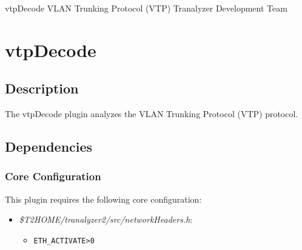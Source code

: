 \documentclass[documentation]{subfiles}
\begin{document}
\trantitle
    {vtpDecode} %
    {VLAN Trunking Protocol (VTP)} %
    {Tranalyzer Development Team} %

\section{vtpDecode}\label{s:vtpDecode}

\subsection{Description}
The vtpDecode plugin analyzes the VLAN Trunking Protocol (VTP) protocol.

\subsection{Dependencies}

\subsubsection{Core Configuration}
This plugin requires the following core configuration:
\begin{itemize}
    \item {\em \$T2HOME/tranalyzer2/src/networkHeaders.h}:
        \begin{itemize}
            \item {\tt ETH\_ACTIVATE>0}
        \end{itemize}
\end{itemize}
\end{document}
